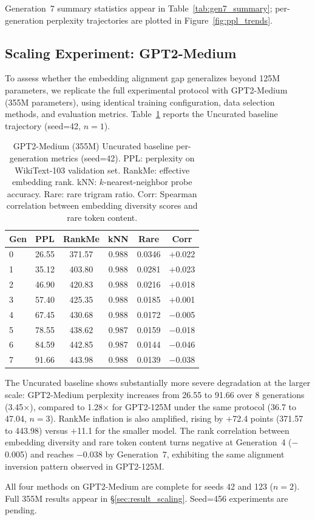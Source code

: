 Generation~7 summary statistics appear in Table~\ref{tab:gen7_summary}; per-generation perplexity trajectories are plotted in Figure~\ref{fig:ppl_trends}.

\subsection{Scaling Experiment: GPT2-Medium}
\label{sec:scaling}

To assess whether the embedding alignment gap generalizes beyond 125M parameters, we replicate the full experimental protocol with GPT2-Medium (355M parameters), using identical training configuration, data selection methods, and evaluation metrics. Table~\ref{tab:medium_uncurated} reports the Uncurated baseline trajectory (seed=42, $n{=}1$).

\begin{table}[t]
\centering
\small
\begin{tabular}{lccccc}
\toprule
Gen & PPL & RankMe & kNN & Rare & Corr \\
\midrule
0 & 26.55 & 371.57 & 0.988 & 0.0346 & $+$0.022 \\
1 & 35.12 & 403.80 & 0.988 & 0.0281 & $+$0.023 \\
2 & 46.90 & 420.83 & 0.988 & 0.0216 & $+$0.018 \\
3 & 57.40 & 425.35 & 0.988 & 0.0185 & $+$0.001 \\
4 & 67.45 & 430.68 & 0.988 & 0.0172 & $-$0.005 \\
5 & 78.55 & 438.62 & 0.987 & 0.0159 & $-$0.018 \\
6 & 84.59 & 442.85 & 0.987 & 0.0144 & $-$0.046 \\
7 & 91.66 & 443.98 & 0.988 & 0.0139 & $-$0.038 \\
\bottomrule
\end{tabular}
\caption{GPT2-Medium (355M) Uncurated baseline per-generation metrics (seed=42). PPL: perplexity on WikiText-103 validation set. RankMe: effective embedding rank. kNN: $k$-nearest-neighbor probe accuracy. Rare: rare trigram ratio. Corr: Spearman correlation between embedding diversity scores and rare token content.}
\label{tab:medium_uncurated}
\end{table}

The Uncurated baseline shows substantially more severe degradation at the larger scale: GPT2-Medium perplexity increases from 26.55 to 91.66 over 8 generations (3.45$\times$), compared to 1.28$\times$ for GPT2-125M under the same protocol (36.7 to 47.04, $n{=}3$). RankMe inflation is also amplified, rising by $+$72.4 points (371.57 to 443.98) versus $+$11.1 for the smaller model. The rank correlation between embedding diversity and rare token content turns negative at Generation~4 ($-$0.005) and reaches $-$0.038 by Generation~7, exhibiting the same alignment inversion pattern observed in GPT2-125M.

All four methods on GPT2-Medium are complete for seeds 42 and 123 ($n{=}2$). Full 355M results appear in \S\ref{sec:result_scaling}. Seed=456 experiments are pending.%
